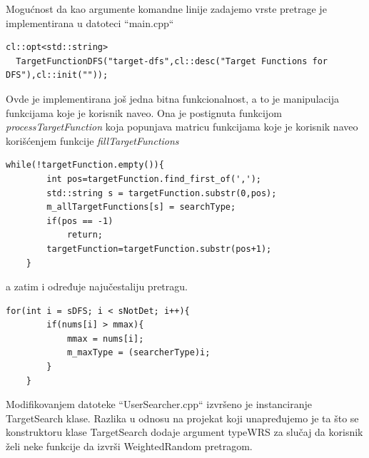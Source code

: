 \documentclass[a4paper]{article}
\begin{document}
Mogućnost da kao argumente komandne linije zadajemo vrste pretrage je implementirana u datoteci ``main.cpp`` 
\begin{lstlisting}[title={Definisanje imena pretrage za komandnu liniju}]
cl::opt<std::string>
  TargetFunctionDFS("target-dfs",cl::desc("Target Functions for DFS"),cl::init(""));
\end{lstlisting}
Ovde je implementirana još jedna bitna funkcionalnost, a to je manipulacija funkcijama koje je korisnik naveo. Ona je postignuta funkcijom \textit{processTargetFunction} koja popunjava matricu funkcijama koje je korisnik naveo korišćenjem funkcije \textit{fillTargetFunctions}
\begin{lstlisting}[title={Popunjavanje mape}]
    while(!targetFunction.empty()){
        int pos=targetFunction.find_first_of(',');
        std::string s = targetFunction.substr(0,pos);
        m_allTargetFunctions[s] = searchType;
        if(pos == -1)
            return;
        targetFunction=targetFunction.substr(pos+1);
    }
\end{lstlisting}

a zatim i određuje najučestaliju pretragu. 
\begin{lstlisting}[title={Određivanje najučestalije pretrage}]
    for(int i = sDFS; i < sNotDet; i++){
        if(nums[i] > mmax){
            mmax = nums[i];
            m_maxType = (searcherType)i;
        }
    }
\end{lstlisting}

Modifikovanjem datoteke ``UserSearcher.cpp`` izvršeno je instanciranje TargetSearch klase. Razlika u odnosu na projekat koji unapređujemo je ta što se konstruktoru klase TargetSearch dodaje argument typeWRS za slučaj da korisnik želi neke funkcije da izvrši WeightedRandom pretragom.
\end{document}

